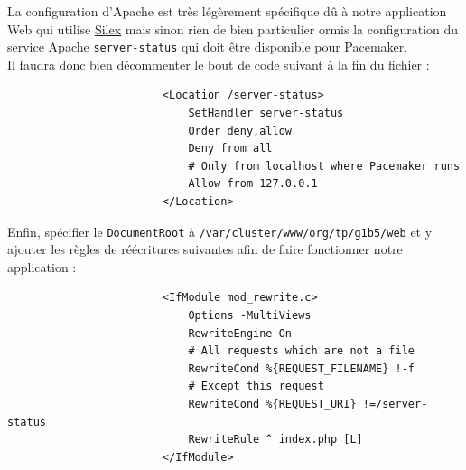 \documentclass[11pt,a4paper]{report}
\begin{document}
                    La configuration d'Apache est tr\`es l\'eg\`erement sp\'ecifique d\^u \`a notre application Web qui utilise \underline{\href{http://silex.sensiolabs.org}{Silex}} mais sinon rien de bien particulier ormis la configuration du service Apache \verb+server-status+ qui doit \^etre disponible pour Pacemaker.\\
                    
                    Il faudra donc bien d\'ecommenter le bout de code suivant \`a la fin du fichier :\\
                    
                    \begin{verbatim}
                        <Location /server-status>
                            SetHandler server-status
                            Order deny,allow
                            Deny from all
                            # Only from localhost where Pacemaker runs
                            Allow from 127.0.0.1
                        </Location>
                    \end{verbatim}
                    
                    Enfin, sp\'ecifier le \verb+DocumentRoot+ \`a \verb+/var/cluster/www/org/tp/g1b5/web+ et y ajouter les r\`egles de r\'e\'ecritures suivantes afin de faire fonctionner notre application :\\
                    
                    \begin{verbatim}
                        <IfModule mod_rewrite.c>
                            Options -MultiViews
                            RewriteEngine On
                            # All requests which are not a file
                            RewriteCond %{REQUEST_FILENAME} !-f
                            # Except this request
                            RewriteCond %{REQUEST_URI} !=/server-status
                            RewriteRule ^ index.php [L]
                        </IfModule>
                    \end{verbatim}
                    
\end{document}
